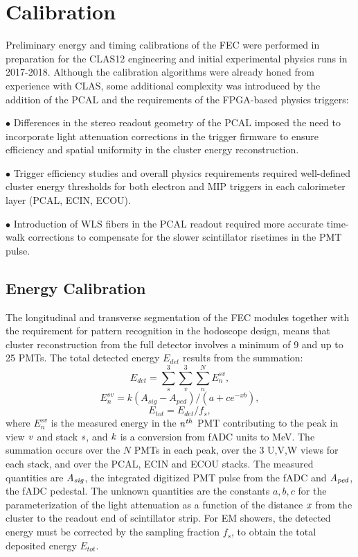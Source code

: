 \section{Calibration} \label{Calibration}

Preliminary energy and timing calibrations of the FEC were performed in preparation for the CLAS12 engineering and initial experimental physics runs in 2017-2018.  Although the calibration algorithms were already honed from experience with CLAS, some additional complexity was introduced by the addition of the PCAL and the requirements of the FPGA-based physics triggers: 

$\bullet$ Differences in the stereo readout geometry of the PCAL imposed the need to incorporate light attenuation corrections in the trigger firmware to ensure efficiency and spatial uniformity in the cluster energy reconstruction.

$\bullet$ Trigger efficiency studies and overall physics requirements required well-defined cluster energy thresholds for both electron and MIP triggers in each calorimeter layer (PCAL, ECIN, ECOU).

$\bullet$ Introduction of WLS fibers in the PCAL readout required more accurate time-walk corrections to compensate for the slower scintillator risetimes in the PMT pulse.

\subsection{Energy Calibration}
The longitudinal and transverse segmentation of the FEC modules together with the requirement for pattern recognition in the hodoscope design, means that cluster reconstruction from the full detector involves a minimum of 9 and up to 25 PMTs.  The total detected energy $E_{det}$ results from the summation:
\begin{equation}
 E_{det} = \sum_{s}^{3} \sum_{v}^{3} \sum_{n}^{N} E_{n}^{sv},\label{eq:E1}
\end{equation}
\begin{equation}
 E_{n}^{sv} = k(A_{sig}-A_{ped})/(a+c e^{-xb}),   \label{eq:E2}
\end{equation}
\begin{equation}
 E_{tot} = E_{det}/f_{s},                 \label{eq:E3}
\end{equation}
where $E_{n}^{sv}$ is the measured energy in the $\it{n^{th}}$ PMT contributing to the peak 
in view $\it{v}$ and stack $\it{s}$, and $\it{k}$ is a conversion from fADC units to MeV.  The summation occurs over the $N$ PMTs in each peak, over the 3 U,V,W views for each stack, and over the PCAL, ECIN and ECOU stacks.  The measured quantities are $\it{A_{sig}}$, the integrated digitized PMT pulse from the fADC and $\it{A_{ped}}$, the fADC pedestal.  The unknown quantities are the constants $a,b,c$ for the parameterization of the light attenuation as a function of the distance $\it{x}$ from the cluster to the readout end of scintillator strip. For EM showers, the detected energy must be corrected by the sampling fraction $f_{s}$, to obtain the total deposited energy $E_{tot}$.  

